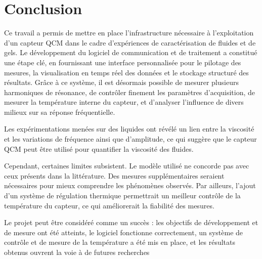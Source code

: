 \chapter{Conclusion}

Ce travail a permis de mettre en place l’infrastructure nécessaire à l’exploitation d’un capteur QCM dans le cadre d’expériences de caractérisation de fluides et de gels. Le développement du logiciel de communication et de traitement a constitué une étape clé, en fournissant une interface personnalisée pour le pilotage des mesures, la visualisation en temps réel des données et le stockage structuré des résultats. Grâce à ce système, il est désormais possible de mesurer plusieurs harmoniques de résonance, de contrôler finement les paramètres d’acquisition, de mesurer la température interne du capteur, et d’analyser l’influence de divers milieux sur sa réponse fréquentielle.

Les expérimentations menées sur des liquides ont révélé un lien entre la viscosité et les variations de fréquence ainsi que d’amplitude, ce qui suggère que le capteur QCM peut être utilisé pour quantifier la viscosité des fluides.

Cependant, certaines limites subsistent. Le modèle utilisé ne concorde pas avec ceux présents dans la littérature. Des mesures supplémentaires seraient nécessaires pour mieux comprendre les phénomènes observés. Par ailleurs, l’ajout d’un système de régulation thermique permettrait un meilleur contrôle de la température du capteur, ce qui améliorerait la fiabilité des mesures.

Le projet peut être considéré comme un succès : les objectifs de développement et de mesure ont été atteints, le logiciel fonctionne correctement, un système de contrôle et de mesure de la température a été mis en place, et les résultats obtenus ouvrent la voie à de futures recherches

\hspace{8cm}\begin{minipage}{5cm}
    \printsignature
\end{minipage}